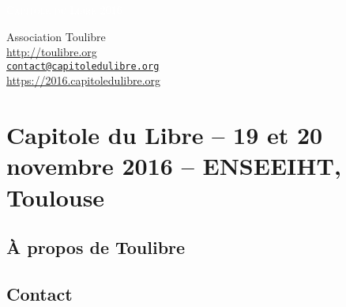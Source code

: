 \documentclass{cdl_sponsor}
\begin{document}
\thispagestyle{empty} %



\parbox[t]{1.0\textwidth}{
	\flushright \fontsize{44pt}{56pt}\selectfont %

	\textcolor{white}{
		\hfill \textsc{Capitole du Libre 2016} \\
		\fontsize{36pt}{48pt}\selectfont{
      \hfill 19 et 20 novembre 2016 \\
    }
		\fontsize{24pt}{36pt}
	}
	\par

}




	

\vfill %

{\centering \large
\hfill Association Toulibre \\
\hfill \url{http://toulibre.org} \\
\hfill \href{mailto:contact@capitoledulibre.org}{\texttt{contact@capitoledulibre.org}} \\
\hfill \url{https://2016.capitoledulibre.org} \\
}


\section{Capitole du Libre {\small -- 19 et 20 novembre 2016 -- ENSEEIHT, Toulouse}}

	

\subsection{À propos de Toulibre}

  

\subsection{Contact}

	
\end{document}
